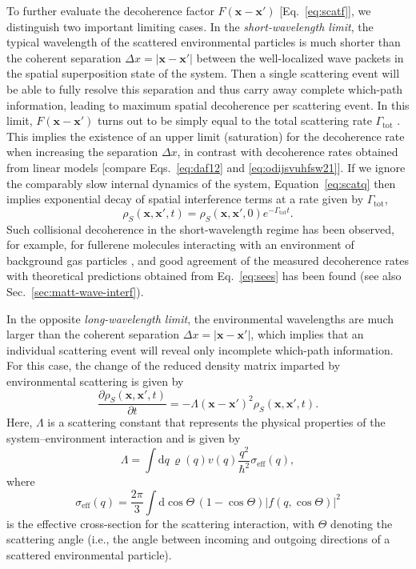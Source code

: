 \documentclass[3p,sort&compress,12pt]{elsarticle}
\providecommand{\abs}[1]{\left\lvert#1\right\rvert}
\newcommand{\D}{\ensuremath{\mathrm{d}}}
\newcommand{\E}{\ensuremath{e}}
\renewcommand{\vec}[1]{\ensuremath{\mathbf{#1}}}
\begin{document}
To further evaluate the decoherence factor $F(\vec{x} - \vec{x}')$ [Eq.~\eqref{eq:scatf}], we distinguish two important limiting cases. In the \emph{short-wavelength limit}, the typical wavelength of the scattered environmental particles is much shorter than the coherent separation $\Delta x = \abs{\vec{x}-\vec{x}'}$ between the well-localized wave packets in the spatial superposition state of the system. Then a single scattering event will be able to fully resolve this separation and thus carry away complete which-path information, leading to maximum spatial decoherence per scattering event. In this limit, $F(\vec{x} - \vec{x}')$ turns out to be simply equal to the total scattering rate $\Gamma_\text{tot}$ \cite{Schlosshauer:2007:un}. This implies the existence of an upper limit (saturation) for the decoherence rate when increasing the separation $\Delta x$, in contrast with decoherence rates obtained from linear models [compare Eqs.~\eqref{eq:daf12} and \eqref{eq:odijsvuhfsw21}]. If we ignore the comparably slow internal dynamics of the system, Equation~\eqref{eq:scatq} then implies exponential decay of spatial interference terms at a rate given by $\Gamma_\text{tot}$,
%
\begin{equation}\label{eq:sees}
\rho_S(\vec{x},\vec{x}',t) =
\rho_S(\vec{x},\vec{x}',0) \E^{-\Gamma_\text{tot} t}.
\end{equation}
%
Such collisional decoherence in the short-wavelength regime has been observed, for example, for fullerene molecules interacting with an environment of background gas particles \cite{Hackermuller:2003:uu}, and good agreement of the measured decoherence rates with theoretical predictions obtained from Eq.~\eqref{eq:sees} has been found \cite{Hornberger:2003:tv} (see also Sec.~\ref{sec:matt-wave-interf}).

In the opposite \emph{long-wavelength limit}, the environmental wavelengths are much larger than the coherent separation $\Delta x = \abs{\vec{x}-\vec{x}'}$, which implies that an individual scattering event will reveal only incomplete which-path information. For this case, the change of the reduced density matrix imparted by environmental scattering is given by
%
\begin{equation}\label{eq:scwer1} 
  \frac{\partial\rho_S(\vec{x},\vec{x}',t)}{\partial t} = - \Lambda
  (\vec{x} -\vec{x'})^2   \rho_{S}(\vec{x},\vec{x}',t).
\end{equation}
% 
Here, $\Lambda$ is a scattering constant that represents the physical properties of the system--environment interaction and is given by
%
\begin{equation}\label{eq:scatfls2} 
\Lambda =  \int \D q\,  \varrho(q) v(q) 
\frac{q^2}{\hbar^2} \sigma_\text{eff}(q),
\end{equation}
%
where
%
\begin{equation}\label{eq:sccs} 
  \sigma_\text{eff}(q) = \frac{2\pi}{3} \int  \D \cos\Theta \,
  \left(1 - \cos \Theta \right)  \abs{ f(q, \cos\Theta)}^2 
\end{equation}
%
is the effective cross-section for the scattering interaction, with $\Theta$ denoting the scattering angle (i.e., the angle between incoming and outgoing directions of a scattered environmental particle).
\end{document}
